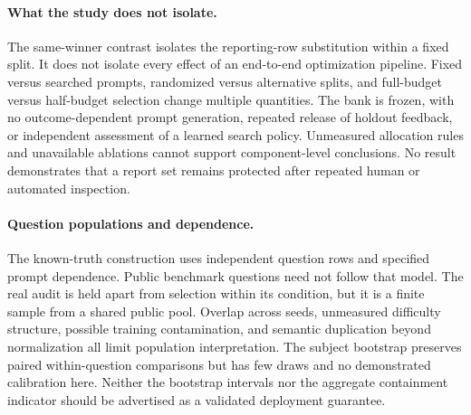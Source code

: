 \documentclass{article}
\begin{document}
\paragraph{What the study does not isolate.}
The same-winner contrast isolates the reporting-row substitution within a fixed split. It does not isolate every effect of an end-to-end optimization pipeline. Fixed versus searched prompts, randomized versus alternative splits, and full-budget versus half-budget selection change multiple quantities. The bank is frozen, with no outcome-dependent prompt generation, repeated release of holdout feedback, or independent assessment of a learned search policy. Unmeasured allocation rules and unavailable ablations cannot support component-level conclusions. No result demonstrates that a report set remains protected after repeated human or automated inspection.

\paragraph{Question populations and dependence.}
The known-truth construction uses independent question rows and specified prompt dependence. Public benchmark questions need not follow that model. The real audit is held apart from selection within its condition, but it is a finite sample from a shared public pool. Overlap across seeds, unmeasured difficulty structure, possible training contamination, and semantic duplication beyond normalization all limit population interpretation. The subject bootstrap preserves paired within-question comparisons but has few draws and no demonstrated calibration here. Neither the bootstrap intervals nor the aggregate containment indicator should be advertised as a validated deployment guarantee.
\end{document}
